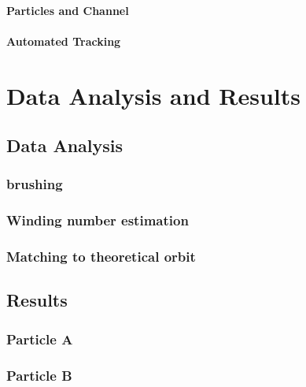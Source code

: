 \documentclass[]{report}
\begin{document}
\subsection{Particles and Channel}




\subsection{Automated Tracking}
     




\part{Data Analysis and Results}
\chapter{Data Analysis}


\section{brushing}


\section{Winding number estimation}


\section{Matching to theoretical orbit}




\chapter{Results}


\section{Particle A}

\newpage
\section{Particle B}

\end{document}
